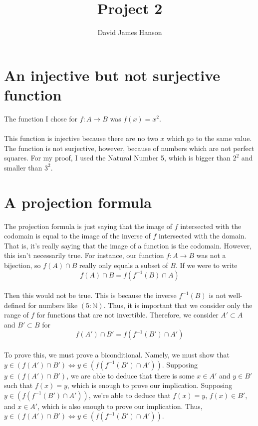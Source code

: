 \documentclass{amsart}
\title{Project 2}
\author{David James Hanson}
\begin{document}
\maketitle

\section{An injective but not surjective function}

The function I chose for $f : A \to B$ was $f(x) = x^2$. \\ \\

This function is injective because there are no two $x$ which go to the same value. The function is not surjective, however, because of numbers which are not perfect squares. For my proof, I used the Natural Number 5, which is bigger than $2^2$ and smaller than $3^2$.

\section{A projection formula}

The projection formula is just saying that the image of $f$ intersected with the codomain is equal to the image of the inverse of $f$ intersected with the domain. That is, it's really saying that the image of a function is the codomain. However, this isn't necessarily true. For instance, our function $f : A \to B$ was not a bijection, so $f(A) \cap B$ really only equals a subset of $B$. If we were to write 
	\[ f(A) \cap B = f(f^{-1}(B) \cap A) \] \\
Then this would not be true.  This is because the inverse $f^{-1}(B)$ is not well-defined for numbers like $(5 : \mathbb{N})$. Thus, it is important that we consider only the range of $f$ for functions that are not invertible. Therefore, we consider $A' \subset A$ and $B' \subset B$ for
	\[ f(A') \cap B' = f(f^{-1}(B') \cap A') \] \\

To prove this, we must prove a biconditional. Namely, we must show that $y \in (f(A') \cap B') \iff y \in (f(f^{-1}(B') \cap A'))$. Supposing $y \in (f(A') \cap B')$, we are able to deduce that there is some $x \in A'$ and $y \in B'$ such that $f(x) = y$, which is enough to prove our implication. Supposing $y \in (f(f^{-1}(B') \cap A'))$, we're able to deduce that $f(x) = y$, $f(x) \in B'$, and $x \in A'$, which is also enough to prove our implication. Thus, $y \in (f(A') \cap B') \iff y \in (f(f^{-1}(B') \cap A'))$.
\end{document}
